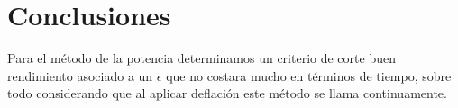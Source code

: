 \section{Conclusiones}%

Para el método de la potencia determinamos un criterio de corte buen rendimiento asociado a un $\epsilon$ que no costara mucho en términos de tiempo, sobre todo considerando que al aplicar deflación este método se llama continuamente.


\label{sec:conclusiones}

